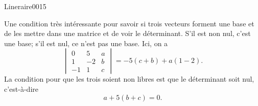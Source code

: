 \begin{corrige}{Lineraire0015}

	Une condition très intéressante pour savoir si trois vecteurs forment une base et de les mettre dans une matrice et de voir le déterminant. S'il est non nul, c'est une base; s'il est nul, ce n'est pas une base. Ici, on a
	\begin{equation}
		\begin{vmatrix}
			0	&	5	&	a	\\
			1	&	-2	&	b	\\
			-1	&	1	&	c
		\end{vmatrix}=
		-5(c+b)+a(1-2).
	\end{equation}
	La condition pour que les trois soient non libres est que le déterminant soit nul, c'est-à-dire
	\begin{equation}
		a+5(b+c)=0.
	\end{equation}
	

\end{corrige}
